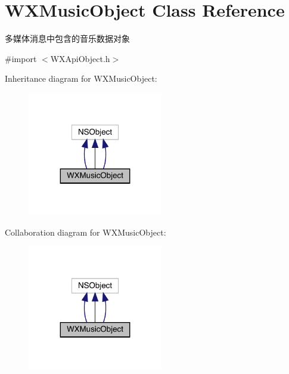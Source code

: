 \hypertarget{interface_w_x_music_object}{}\section{W\+X\+Music\+Object Class Reference}
\label{interface_w_x_music_object}


多媒体消息中包含的音乐数据对象  




{\ttfamily \#import $<$W\+X\+Api\+Object.\+h$>$}



Inheritance diagram for W\+X\+Music\+Object\+:\nopagebreak
\begin{figure}[H]
\begin{center}
\leavevmode
\includegraphics[width=167pt]{interface_w_x_music_object__inherit__graph}
\end{center}
\end{figure}


Collaboration diagram for W\+X\+Music\+Object\+:\nopagebreak
\begin{figure}[H]
\begin{center}
\leavevmode
\includegraphics[width=167pt]{interface_w_x_music_object__coll__graph}
\end{center}
\end{figure}
